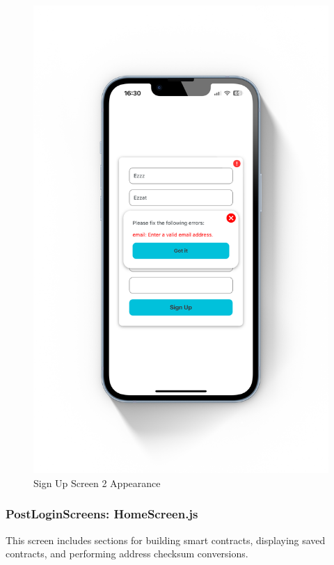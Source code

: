 \begin{figure}[!ht]
\begin{minipage}{0.49\textwidth}
        \includegraphics[scale=0.1]{LATEX/Appendices/Images/Software/Frontend/sign_up_screen_2.png}
        \caption{Sign Up Screen 2 Appearance}
        \label{fig:sign up screen 2}
        \end{minipage}
\end{figure}

\subsubsection{PostLoginScreens: HomeScreen.js}

This screen includes sections for building smart contracts, displaying saved contracts, and performing address checksum conversions.


